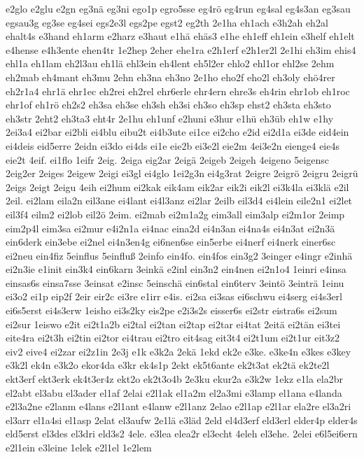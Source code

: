 {e2glo
e2glu
e2gn
eg3nä
eg3ni
ego1p
egro5sse
eg4rö
eg4run
eg4sal
eg4s3an
eg3sau
egsau3g
eg3se
eg4sei
egs2e3l
egs2pe
egst2
eg2th
2e1ha
eh1ach
e3h2ah
eh2al
ehalt4s
e3hand
eh1arm
e2harz
e3haut
e1hä
ehäs3
e1he
eh1eff
eh1ein
e3helf
eh1elt
e4hense
e4h3ente
ehen4tr
1e2hep
2eher
ehe1ra
e2h1erf
e2h1er2l
2e1hi
eh3im
ehis4
ehl1a
eh1lam
eh2l3au
eh1lä
ehl3ein
eh4lent
eh5l2er
ehlo2
ehl1or
ehl2se
2ehm
eh2mab
eh4mant
eh3mu
2ehn
eh3na
eh3no
2e1ho
eho2f
eho2l
eh3oly
ehö4rer
eh2r1a4
ehr1ä
ehr1ec
eh2rei
eh2rel
ehr6erle
ehr4ern
ehre3s
eh4rin
ehr1ob
eh1roc
ehr1of
eh1rö
eh2s2
eh3sa
eh3se
eh3sh
eh3si
eh3so
eh3sp
ehst2
eh3sta
eh3sto
eh3str
2eht2
eh3ta3
eht4r
2e1hu
eh1unf
e2huni
e3hur
e1hü
eh3üb
eh1w
e1hy
2ei3a4
ei2bar
ei2bli
ei4blu
eibu2t
ei4b3ute
ei1ce
ei2cho
e2id
ei2d1a
ei3de
eid4ein
ei4deis
eid5erre
2eidn
ei3do
ei4ds
ei1e
eie2b
ei3e2l
eie2m
4ei3e2n
eienge4
eie4s
eie2t
4eif.
ei1flo
1eifr
2eig.
2eiga
eig2ar
2eigä
2eigeb
2eigeh
4eigeno
5eigensc
2eig2er
2eiges
2eigew
2eigi
ei3gl
ei4glo
1ei2g3n
ei4g3rat
2eigre
2eigrö
2eigru
2eigrü
2eigs
2eigt
2eigu
4eih
ei2hum
ei2kak
eik4am
eik2ar
eik2i
eik2l
ei3k4la
ei3klä
e2il
2eil.
ei2lam
eila2n
eil3ane
ei4lant
ei4l3anz
ei2lar
2eilb
eil3d4
ei4lein
eile2n1
ei2let
eil3f4
eilm2
ei2lob
eil2ö
2eim.
ei2mab
ei2m1a2g
eim3all
eim3alp
ei2m1or
2eimp
eim2p4l
eim3sa
ei2mur
e4i2n1a
ei4nac
eina2d
ei4n3an
ei4na4s
ei4n3at
ei2n3ä
ein6derk
ein3ebe
ei2nel
ei4n3en4g
ei6nen6se
ein5erbe
ei4nerf
ei4nerk
einer6sc
ei2neu
ein4fiz
5einflus
5einfluß
2einfo
ein4fo.
ein4fos
ein3g2
3einger
e4ingr
e2inhä
ei2n3ie
e1init
ein3k4
ein6karn
3einkä
e2inl
ein3n2
ein4nen
ei2n1o4
1einri
e4insa
einsas6s
einsa7sse
3einsat
e2insc
5einschä
ein6stal
ein6terv
3eintö
3einträ
1einu
ei3o2
ei1p
eip2f
2eir
eir2c
ei3re
e1irr
e4is.
ei2sa
ei3sas
ei6schwu
ei4serg
ei4s3erl
ei6s5erst
ei4s3erw
1eisho
ei3s2ky
eis2pe
e2i3s2s
eisser6s
ei2str
eistra6s
ei2sum
ei2sur
1eiswo
e2it
ei2t1a2b
ei2tal
ei2tan
ei2tap
ei2tar
ei4tat
2eitä
ei2tän
ei3tei
eite4ra
ei2t3h
ei2tin
ei2tor
ei4trau
ei2tro
eit4sag
eit3t4
ei2t1um
ei2t1ur
eit3z2
eiv2
eive4
ei2zar
ei2z1in
2e3j
e1k
e3k2a
2ekä
1ekd
ek2e
e3ke.
e3ke4n
e3kes
e3key
e3k2l
ek4n
e3k2o
ekor4da
e3kr
ek4s1p
2ekt
ek5t6ante
ek2t3at
ek2tä
ek2te2l
ekt3erf
ekt3erk
ek4t3er4z
ekt2o
ek2t3o4b
2e3ku
ekur2a
e3k2w
1ekz
e1la
ela2br
el2abt
el3abu
el3ader
el1af
2elai
e2l1ak
el1a2m
el2a3mi
e3lamp
el1ana
e4landa
e2l3a2ne
e2lanm
e4lans
e2l1ant
e4lanw
e2l1anz
2elao
e2l1ap
e2l1ar
ela2re
el3a2ri
el3arr
el1a4si
el1asp
2elat
el3aufw
2e1lä
e3läd
2eld
el4d3erf
eld3erl
elder4p
elder4s
eld5erst
el3des
el3dri
eld3s2
4ele.
e3lea
elea2r
el3echt
4eleh
el3ehe.
2elei
e6l5ei6ern
e2l1ein
e3leine
1elek
e2l1el
1e2lem
}
